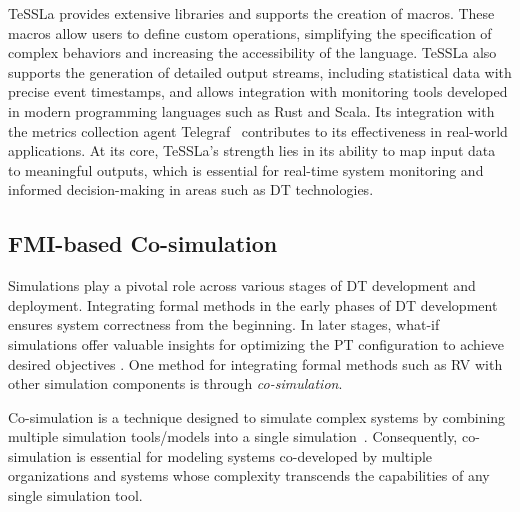 TeSSLa provides extensive libraries and supports the creation of macros. These macros allow users to define custom operations, simplifying the specification of complex behaviors and increasing the accessibility of the language. TeSSLa also supports the generation of detailed output streams, including statistical data with precise event timestamps, and allows integration with monitoring tools developed in modern programming languages such as Rust and Scala. Its integration with the metrics collection agent Telegraf~\cite{TT-Connector} contributes to its effectiveness in real-world applications.
At its core, TeSSLa's strength lies in its ability to map input data to meaningful outputs, which is essential for real-time system monitoring and informed decision-making in areas such as DT technologies.

\subsection{FMI-based Co-simulation}
\label{sc:fmi}
Simulations play a pivotal role across various stages of DT development and deployment.
Integrating formal methods in the early phases of DT development ensures system correctness from the beginning.
In later stages, what-if simulations offer valuable insights for optimizing the PT configuration to achieve desired objectives \cite{Feng2021}.
One method for integrating formal methods such as RV with other simulation components is through \textit{co-simulation}.

Co-simulation is a technique designed to simulate complex systems by combining multiple simulation tools/models into a single simulation~\cite{Gomes2018,Kubler2000}.
Consequently, co-simulation is essential for modeling systems co-developed by multiple organizations and systems whose complexity transcends the capabilities of any single simulation tool.

